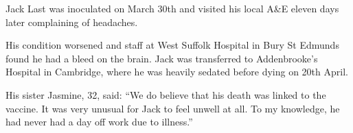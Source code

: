 Jack Last was inoculated on March 30th and visited his local A\&E eleven days
later complaining of headaches.

His condition worsened and staff at West Suffolk Hospital in Bury St Edmunds
found he had a bleed on the brain. Jack was transferred to Addenbrooke’s
Hospital in Cambridge, where he was heavily sedated before dying on 20th April.

His sister Jasmine, 32, said: “We do believe that his death was linked to the
vaccine. It was very unusual for Jack to feel unwell at all. To my knowledge, he
had never had a day off work due to illness.”

